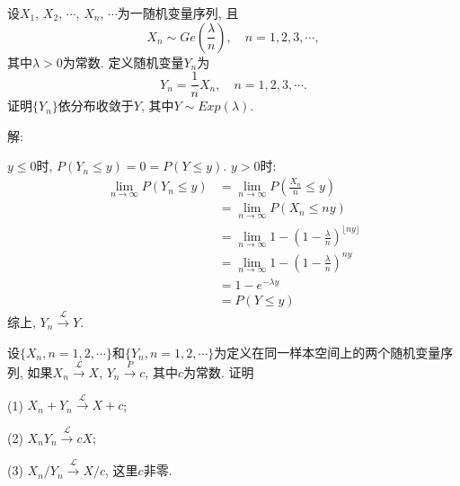 \documentclass[standard]{ExBook}
\begin{document}
\begin{qitems}
\vspace{-5em}

    \begin{bbox}
    \begin{shaded}
        \qitem
设$X_1$, $X_2$, $\cdots$, $X_n$, $\cdots$为一随机变量序列, 且
$$X_n\sim Ge\left(\frac{\lambda}{n}\right),\quad n=1,2,3,\cdots,$$
其中$\lambda>0$为常数. 定义随机变量$Y_n$为
$$Y_n=\frac{1}{n}X_n,\quad n=1,2,3,\cdots.$$
证明$\{Y_n\}$依分布收敛于$Y$, 其中$Y\sim Exp(\lambda)$.
    \end{shaded}
    \end{bbox}

\vspace{-5em}

    \begin{bbox}
解: 

$y\leq 0$时, $P(Y_n \leq y)=0=P(Y\leq y)$. $y>0$时:
\vspace{-0.5em}
\begin{align*}
\lim\limits_{n\to \infty}P(Y_n \leq y) &= \lim\limits_{n\to \infty}P\left(\frac{X_n}{n} \leq y\right) \\
             &= \lim\limits_{n\to \infty}P(X_n \leq ny) \\
             &= \lim\limits_{n\to \infty} 1 - \left(1 - \frac{\lambda}{n}\right)^{\lfloor ny \rfloor}\\
             &= \lim\limits_{n\to \infty} 1 - \left(1 - \frac{\lambda}{n}\right)^{ny}\\
             &= 1 - e^{-\lambda y}\\
             &= P(Y \leq y)
\end{align*}
综上, $Y_n\xrightarrow{\mathcal{L}}Y$.
    \end{bbox}

\vspace{-5em}

    \begin{bbox}
    \begin{shaded}
        \qitem
设$\{X_n,n=1,2,\cdots\}$和$\{Y_n,n=1,2,\cdots\}$为定义在同一样本空间上的两个随机变量序列, 如果$X_n\xrightarrow{\mathcal{L}}X$, $Y_n\xrightarrow{P}c$, 其中$c$为常数. 证明

(1) $X_n+Y_n\xrightarrow{\mathcal{L}}X+c$;

(2) $X_n Y_n\xrightarrow{\mathcal{L}}cX$;

(3) $X_n/Y_n\xrightarrow{\mathcal{L}}X/c$, 这里$c$非零.
    \end{shaded}
    \end{bbox}


\end{qitems}
\end{document}
